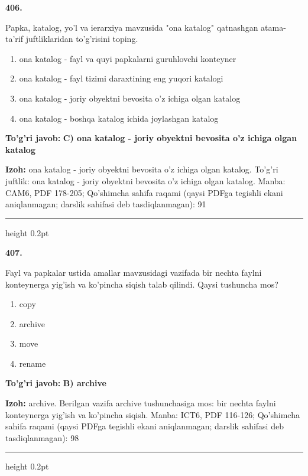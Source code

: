 \documentclass[10pt,a4paper]{article}
\begin{document}
{\bfseries\sffamily\color{ink} 406.}
\par
Papka, katalog, yo'l va ierarxiya mavzusida "ona katalog" qatnashgan atama-ta'rif juftliklaridan to'g'risini toping.
\begin{enumerate}[label=\Alph*),leftmargin=9mm]
\item ona katalog - fayl va quyi papkalarni guruhlovchi konteyner
\item ona katalog - fayl tizimi daraxtining eng yuqori katalogi
\item ona katalog - joriy obyektni bevosita o'z ichiga olgan katalog
\item ona katalog - boshqa katalog ichida joylashgan katalog
\end{enumerate}
\begin{tcolorbox}[enhanced,breakable,colback=teal!4,colframe=teal!60!black,boxrule=0.45pt,arc=1.2mm,left=2.7mm,right=2.7mm,top=1.8mm,bottom=1.8mm,before skip=2mm,after skip=2mm]
{\bfseries\sffamily\color{teal}To'g'ri javob:} \textbf{C) ona katalog - joriy obyektni bevosita o'z ichiga olgan katalog}
\par\smallskip
{\bfseries Izoh:} ona katalog - joriy obyektni bevosita o'z ichiga olgan katalog. To'g'ri juftlik: ona katalog - joriy obyektni bevosita o'z ichiga olgan katalog. Manba: CAM6, PDF 178-205; Qo'shimcha sahifa raqami (qaysi PDFga tegishli ekani aniqlanmagan; darslik sahifasi deb tasdiqlanmagan): 91
\end{tcolorbox}
\vspace{2mm}\hrule height 0.2pt\vspace{3mm}

{\bfseries\sffamily\color{ink} 407.}
\par
Fayl va papkalar ustida amallar mavzusidagi vazifada bir nechta faylni konteynerga yig'ish va ko'pincha siqish talab qilindi. Qaysi tushuncha mos?
\begin{enumerate}[label=\Alph*),leftmargin=9mm]
\item copy
\item archive
\item move
\item rename
\end{enumerate}
\begin{tcolorbox}[enhanced,breakable,colback=teal!4,colframe=teal!60!black,boxrule=0.45pt,arc=1.2mm,left=2.7mm,right=2.7mm,top=1.8mm,bottom=1.8mm,before skip=2mm,after skip=2mm]
{\bfseries\sffamily\color{teal}To'g'ri javob:} \textbf{B) archive}
\par\smallskip
{\bfseries Izoh:} archive. Berilgan vazifa archive tushunchasiga mos: bir nechta faylni konteynerga yig'ish va ko'pincha siqish. Manba: ICT6, PDF 116-126; Qo'shimcha sahifa raqami (qaysi PDFga tegishli ekani aniqlanmagan; darslik sahifasi deb tasdiqlanmagan): 98
\end{tcolorbox}
\vspace{2mm}\hrule height 0.2pt\vspace{3mm}
\end{document}
